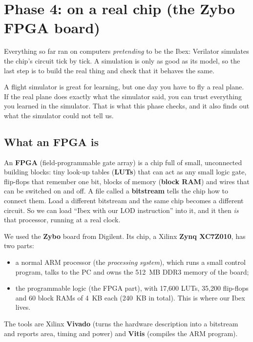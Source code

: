 \section{Phase 4: on a real chip (the Zybo FPGA board)}\label{sec:fpga}

Everything so far ran on computers \emph{pretending} to be the Ibex: Verilator simulates the chip's circuit
tick by tick. A simulation is only as good as its model, so the last step is to build the real thing and
check that it behaves the same.

\begin{kid}
A flight simulator is great for learning, but one day you have to fly a real plane. If the real plane does
exactly what the simulator said, you can trust everything you learned in the simulator. That is what this
phase checks, and it also finds out what the simulator could not tell us.
\end{kid}

\subsection{What an FPGA is}

An \textbf{FPGA} (field-programmable gate array) is a chip full of small, unconnected building blocks: tiny
look-up tables (\textbf{LUTs}) that can act as any small logic gate, flip-flops that remember one bit, blocks of
memory (\textbf{block RAM}) and wires that can be switched on and off. A file called a \textbf{bitstream} tells
the chip how to connect them. Load a different bitstream and the same chip becomes a different circuit. So we can
load ``Ibex with our LOD instruction'' into it, and it then \emph{is} that processor, running at a real clock.

We used the \textbf{Zybo} board from Digilent. Its chip, a Xilinx \textbf{Zynq XC7Z010}, has two parts:
\begin{itemize}
  \item a normal ARM processor (the \emph{processing system}), which runs a small control program, talks to the
        PC and owns the 512~MB DDR3 memory of the board;
  \item the programmable logic (the FPGA part), with 17{,}600 LUTs, 35{,}200 flip-flops and 60 block RAMs of
        4~KB each (240~KB in total). This is where our Ibex lives.
\end{itemize}

The tools are Xilinx \textbf{Vivado} (turns the hardware description into a bitstream and reports area, timing
and power) and \textbf{Vitis} (compiles the ARM program).

